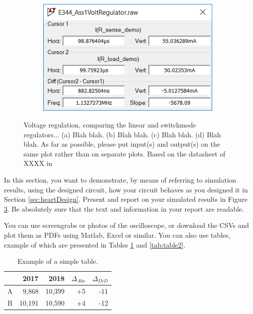 \begin{figure}
\begin{subfigure}[]{0.55\textwidth}
		    \caption{} \label{subfig:pwr_simu_rect}
     \end{subfigure}
    \begin{subfigure}[]{0.4\textwidth}
              \centering
  		\includegraphics[width=1\linewidth]{./Figures/Screengrab2}
		    \caption{} \label{subfig:pwr_simu_rect}
     \end{subfigure}
   \caption[\textcolor{red}{I am the short caption that appears in the List of Figures list}]{Voltage regulation, comparing the linear and switchmode regulators... (a)  Blah blah. (b)  Blah blah.  (c)  Blah blah. (d) Blah blah.   As far as possible, please put input(s) and output(s) on the same plot rather than on separate plots. Based on the datasheet of XXXX in \cite{WebsiteOpAmp}}
    \label{fig:simulation_results_box}
 \end{figure}

In this section, you want to demonstrate, by means of referring to simulation results, using the designed circuit, how your circuit behaves as you designed it in Section \ref{sec:heartDesign}. Present and report on your simulated results in Figure \ref{fig:simulation_results_box}. Be absolutely sure that the text and information in your report are readable. 

You can use screengrabs or photos of the oscilloscope, or download the CSVs and plot them as PDFs using Matlab, Excel or similar. 
You can also use tables, example of which are presented in Tables \ref{tab:table1} and \ref{tab:table2}.


\begin{table}
        \centering
        \footnotesize
        \caption{Example of a simple table.}
         \begin{tabular}{c@{\qquad}rrrr}
          \toprule
             & 2017 & 2018 & $\Delta_{Abs}$ & $\Delta_{DiD}$\\
          \midrule
          A & 9,868      & 10,399 & +5 & -11\\
          B & 10,191     & 10,590 & +4 & -12\\
          \bottomrule
        \end{tabular}
     \label{tab:table1}
\end{table}


